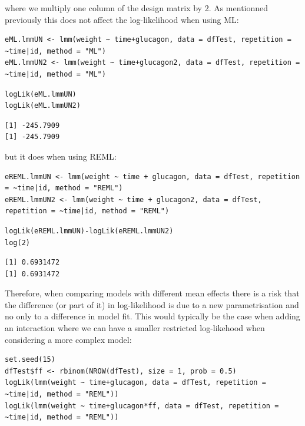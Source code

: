 \documentclass[12pt]{article}
\begin{document}
where we multiply one column of the design matrix by 2. As mentionned
previously this does not affect the log-likelihood when using ML:
\lstset{language=r,label= ,caption= ,captionpos=b,numbers=none}
\begin{lstlisting}
eML.lmmUN <- lmm(weight ~ time+glucagon, data = dfTest, repetition = ~time|id, method = "ML")
eML.lmmUN2 <- lmm(weight ~ time+glucagon2, data = dfTest, repetition = ~time|id, method = "ML")
\end{lstlisting}

\lstset{language=r,label= ,caption= ,captionpos=b,numbers=none}
\begin{lstlisting}
logLik(eML.lmmUN)
logLik(eML.lmmUN2)
\end{lstlisting}

\begin{verbatim}
[1] -245.7909
[1] -245.7909
\end{verbatim}


but it does when using REML:
\lstset{language=r,label= ,caption= ,captionpos=b,numbers=none}
\begin{lstlisting}
eREML.lmmUN <- lmm(weight ~ time + glucagon, data = dfTest, repetition = ~time|id, method = "REML")
eREML.lmmUN2 <- lmm(weight ~ time + glucagon2, data = dfTest, repetition = ~time|id, method = "REML")
\end{lstlisting}

\lstset{language=r,label= ,caption= ,captionpos=b,numbers=none}
\begin{lstlisting}
logLik(eREML.lmmUN)-logLik(eREML.lmmUN2)
log(2)
\end{lstlisting}

\begin{verbatim}
[1] 0.6931472
[1] 0.6931472
\end{verbatim}


Therefore, when comparing models with different mean effects there is
a risk that the difference (or part of it) in log-likelihood is due to
a new parametrisation and no only to a difference in model fit. This
would typically be the case when adding an interaction where we can
have a smaller restricted log-likehood when considering a more complex
model:

\lstset{language=r,label= ,caption= ,captionpos=b,numbers=none}
\begin{lstlisting}
set.seed(15) 
dfTest$ff <- rbinom(NROW(dfTest), size = 1, prob = 0.5)
logLik(lmm(weight ~ time+glucagon, data = dfTest, repetition = ~time|id, method = "REML"))
logLik(lmm(weight ~ time+glucagon*ff, data = dfTest, repetition = ~time|id, method = "REML"))
\end{lstlisting}
\end{document}
